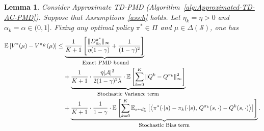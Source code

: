 \documentclass[10pt]{article}
\newcommand{\calA}{\mathcal{A}}
\newcommand{\calS}{\mathcal{S}}
\newcommand{\E}{\mathbb{E}}
\newcommand{\ls}{\left}
\newcommand{\rs}{\right}
\theoremstyle{plain}
\newtheorem{lemma}[theorem]{Lemma}
\theoremstyle{definition}
\begin{document}
\begin{lemma}
    Consider Approximate TD-PMD \textup{(}Algorithm~\ref{alg:Approximated-TD-AC-PMD}\textup{)}. Suppose that Assumptions~\ref{ass:h} holds. Let $\eta_k = \eta > 0$ and $\alpha_k = \alpha \in (0,1]$. Fixing any optimal policy $\pi^*\in \Pi$ and $\mu \in \Delta(\calS)$, one has
    \begin{align*}
        \E\ls[ V^*(\mu) - V^{\pi_{\hat K}}(\mu) \rs] &\leq \underbrace{\frac{1}{K+1} \ls[ \frac{\| D^{\pi^*}_{\pi_0} \|_\infty}{\eta(1-\gamma)} + \frac{1}{(1-\gamma)^2}  \rs]}_{\mbox{ \small Exact PMD bound}} \\
        &\;\;\;\;+ \underbrace{\frac{1}{K+1} \cdot \frac{\eta |\calA|^2}{2(1-\gamma)^2\lambda} \cdot \E\ls[ \sum_{k=0}^K \| Q^{k} - Q^{\pi_k} \|_\infty^2 \rs]}_{\mbox{\small Stochastic Variance term}} \\
        &\;\;\;\;+ \underbrace{\frac{1}{K+1} \cdot \frac{1}{1-\gamma} \cdot \E \ls[ \sum_{k=0}^K \E_{s\sim d^*_\mu} \ls[ \ls\langle \pi^*(\cdot|s) - \pi_k(\cdot|s), \, Q^{\pi_k}(s,\cdot) - Q^k(s,\cdot) \rs\rangle \rs] \rs]}_{\mbox{\small Stochastic Bias term}}.
    \end{align*}
    \label{lem:Approximated-TD-AC-PMD:Lan-Xiao-bound}
\end{lemma}
\end{document}
